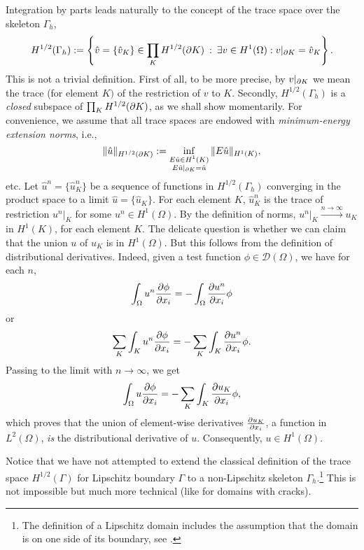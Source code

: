 Integration by parts leads naturally to the concept of the trace space over the skeleton $\Gamma_h$,
\[
H^{1/2}(\Gamma_h) := 
{
\left\{ \hat{v} = \{\hat{v}_K \} \in \prod_K H^{1/2}(\ptl K) \: :
\: \exists v \in H^1(\Omega) : v\vert_{\ptl K} = \hat{v}_K \right\}.}
\]
This is not a trivial definition. First of all, to be more precise, by
${v}\vert_{\ptl K}$ we mean the trace (for element $K)$
of the restriction of ${v}$ to $K$. Secondly,
$H^{1/2}(\Gamma_h)$ is a {\em closed} subspace of $\prod_K
H^{1/2}(\ptl K)$, as we shall show momentarily. For convenience, we
assume that all trace spaces are endowed with {\em minimum-energy
  extension norms}, i.e.,
\[
 \Vert {\hat{u}}\Vert_{H^{1/2}(\ptl K)} :=
\inf_{\substack{
E{\hat{u}} \in H^1(K)\\ 
E{\hat{u}}\vert_{\ptl K} = {\hat{u}}}}
\Vert E{\hat{u}} \Vert_{H^1(K)},
\]
etc. Let 
${\hat{u}}^n = \{ {\hat{u}}^n_K \} $ be a sequence of functions in
$H^{1/2}(\Gamma_h)$ converging in the product space to a limit ${\hat{u}} =
\{{\hat{u}}_K \} $. For each element $K$, ${\hat{u}}^n_K$ 
is the trace of restriction
${u}^n\vert_K$ for some ${u}^n \in H^1(\Omega)$.  By the definition of
norms, ${u}^n\vert_K \stackrel{n \to \infty}{\longrightarrow} 
{u}_K$ in $H^1(K)$, for
each element $K$. The delicate question is whether we can claim that
the union ${u}$ of ${u}_K$ is in $H^1(\Omega)$. But this follows from the
definition of distributional derivatives. Indeed, given a test function $\phi
\in \mathcal{D}(\Omega)$, we have for each $n$,
\[
 \int_\Omega {u}^n \frac{\ptl \phi}{\ptl x_i} = - \int_{\Omega}
\frac{\ptl {u}^n}{\ptl x_i} \phi 
\] 
or 
\[ \sum_K \int_K {u}^n \frac{\ptl
  \phi}{\ptl x_i} = - \sum_K \int_K \frac{\ptl {u}^n}{\ptl x_i} \phi.
\]
Passing to the limit with $n \to \infty$, we get 
\[ \int_\Omega {u}
\frac{\ptl \phi}{\ptl x_i} = - \sum_K \int_K \frac{\ptl {u}_K}{\ptl x_i}
\phi, 
\] 
which proves that the union of element-wise derivatives
$\frac{\ptl {u}_K}{\ptl x_i}$, a function in $L^2(\Omega)$, {\em is} the
distributional derivative of ${u}$. Consequently, ${u} \in H^1(\Omega)$.

Notice that we have not attempted to extend the classical definition
of the trace space $H^{1/2}(\Gamma)$ for Lipschitz boundary $\Gamma$
to a non-Lipschitz skeleton $\Gamma_h$.\footnote{The definition of a
  Lipschitz domain includes the assumption that the domain is on one
  side of its boundary, see \cite[pp. 89]{McLean}.}  This is not
impossible but much more technical (like for domains with cracks).

